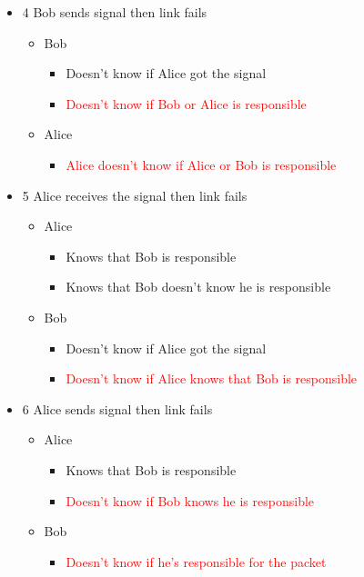 \documentclass[../HFT-main.tex]{subfiles}
\begin{document}
\begin{itemize}
    \item 4 Bob sends signal then link fails
    \begin{itemize}
        \item Bob
        \begin{itemize}
            \item {Doesn’t know if Alice got the signal}
            \item \textcolor{red}{Doesn’t know if Bob or Alice is responsible}
        \end{itemize}
        \item Alice
        \begin{itemize}
            \item \textcolor{red}{Alice doesn’t know if Alice or Bob is responsible}
        \end{itemize}
    \end{itemize}

    \item 5 Alice receives the signal then link fails
    \begin{itemize}
        \item Alice
        \begin{itemize}
            \item Knows that Bob is responsible
            \item Knows that Bob doesn’t know he is responsible
        \end{itemize}
        \item Bob
        \begin{itemize}
            \item Doesn’t know if Alice got the signal
            \item \textcolor{red}{Doesn’t know if Alice knows that Bob is responsible}
        \end{itemize}
    \end{itemize}

    \item 6 Alice sends signal then link fails
    \begin{itemize}
        \item Alice
        \begin{itemize}
            \item Knows that Bob is responsible
            \item \textcolor{red}{Doesn’t know if Bob knows he is responsible}
        \end{itemize}
        \item Bob
        \begin{itemize}
            \item \textcolor{red}{Doesn’t know if he’s responsible for the packet}
        \end{itemize}
    \end{itemize}


\end{itemize}
\end{document}
